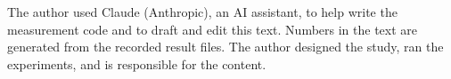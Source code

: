 \begin{acks}
The author used Claude (Anthropic), an AI assistant, to help write the measurement
code and to draft and edit this text. Numbers in the text are generated from
the recorded result files. The author designed the study, ran the experiments,
and is responsible for the content.
\end{acks}

